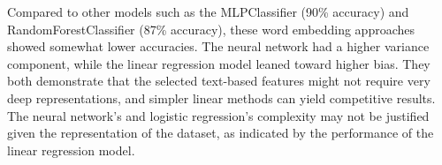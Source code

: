 Compared to other models such as the MLPClassifier (90\% accuracy) and RandomForestClassifier (87\% accuracy), these word embedding approaches showed somewhat lower accuracies. The neural network had a higher variance component, while the linear regression model leaned toward higher bias. They both demonstrate that the selected text-based features might not require very deep representations, and simpler linear methods can yield competitive results. The neural network's and logistic regression's complexity may not be justified given the representation of the dataset, as indicated by the performance of the linear regression model.